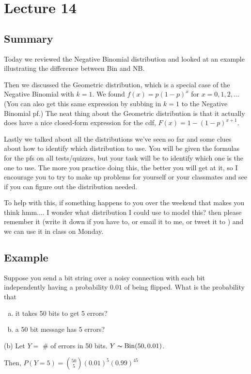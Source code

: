 \section{Lecture 14}
\subsection{Summary}
Today we reviewed the Negative Binomial distribution and looked at an example illustrating the difference between Bin and NB.

Then we discussed the Geometric distribution, which is a special case of the Negative Binomial with $k=1$. We found $f(x)=p(1-p)^x$ for $x = 0,1,2,\ldots$ (You can also get this same expression by subbing in $k=1$ to the Negative Binomial pf.) The neat thing about the Geometric distribution is that it actually does have a nice closed-form expression for the cdf, $F(x)=1-(1-p)^{x+1}$.

Lastly we talked about all the distributions we've seen so far and some clues about how to identify which distribution to use. You will be given the formulas for the pfs on all tests/quizzes, but your task will be to identify which one is the one to use. The more you practice doing this, the better you will get at it, so I encourage you to try to make up problems for yourself or your classmates and see if you can figure out the distribution needed.

To help with this, if something happens to you over the weekend that makes you think hmm.... I wonder what distribution I could use to model this? then please remember it (write it down if you have to, or email it to me, or tweet it to \@ActSciProf) and we can use it in class on Monday.

\subsection{Example}
Suppose you send a bit string over a noisy connection with
each bit independently having a probability $ 0.01 $ of being
flipped. What is the probability that
\begin{enumerate}[(a)]
    \item it takes 50 bits to get 5 errors?
    \item a 50 bit message has 5 errors?
\end{enumerate}

(b) Let $ Y= $ \# of errors in 50 bits. $ Y\thicksim\operatorname{Bin}(50,0.01) $.

Then, $ P(Y=5)=\binom{50}{5}(0.01)^5(0.99)^{45} $

